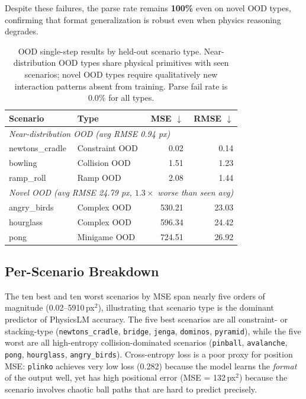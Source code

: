 \documentclass{article}
\begin{document}
Despite these failures, the parse rate remains \textbf{100\%} even on novel OOD
types, confirming that format generalization is robust even when physics reasoning
degrades.

\begin{table}[t]
\centering
\caption{OOD single-step results by held-out scenario type.
Near-distribution OOD types share physical primitives with seen scenarios;
novel OOD types require qualitatively new interaction patterns absent from training.
Parse fail rate is 0.0\% for all types.}
\label{tab:ood}
\small
\begin{tabular}{llrr}
\toprule
\textbf{Scenario} & \textbf{Type} & \textbf{MSE $\downarrow$} & \textbf{RMSE $\downarrow$} \\
\midrule
\multicolumn{4}{l}{\textit{Near-distribution OOD (avg RMSE 0.94 px)}} \\
newtons\_cradle &  Constraint OOD &     0.02 &   0.14 \\
bowling         &  Collision OOD  &     1.51 &   1.23 \\
ramp\_roll      &  Ramp OOD       &     2.08 &   1.44 \\
\midrule
\multicolumn{4}{l}{\textit{Novel OOD (avg RMSE 24.79 px, $1.3\times$ worse than seen avg)}} \\
angry\_birds    &  Complex OOD    &   530.21 &  23.03 \\
hourglass       &  Complex OOD    &   596.34 &  24.42 \\
pong            &  Minigame OOD   &   724.51 &  26.92 \\
\bottomrule
\end{tabular}
\end{table}

\subsection{Per-Scenario Breakdown}

The ten best and ten worst scenarios by MSE span nearly five orders of magnitude
(0.02--5910\,px$^2$), illustrating that scenario type is the dominant predictor
of PhysicsLM accuracy. The five best scenarios are all constraint- or
stacking-type (\texttt{newtons\_cradle}, \texttt{bridge}, \texttt{jenga},
\texttt{dominos}, \texttt{pyramid}), while the five worst are all
high-entropy collision-dominated scenarios (\texttt{pinball}, \texttt{avalanche},
\texttt{pong}, \texttt{hourglass}, \texttt{angry\_birds}). Cross-entropy loss
is a poor proxy for position MSE: \texttt{plinko} achieves very low loss
(0.282) because the model learns the \emph{format} of the output well, yet has
high positional error (MSE = 132\,px$^2$) because the scenario involves chaotic
ball paths that are hard to predict precisely.
\end{document}
